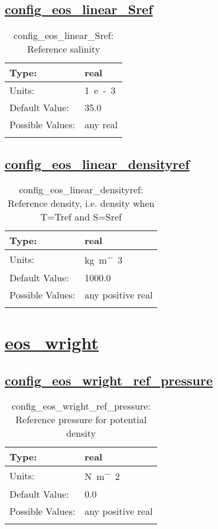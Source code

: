 \subsection[config\_eos\_linear\_Sref]{\hyperref[sec:nm_tab_eos_linear]{config\_eos\_linear\_Sref}}
\label{subsec:nm_sec_config_eos_linear_Sref}
\begin{center}
\begin{longtable}{| p{2.0in} || p{4.0in} |}
    \hline
    Type: & real \\
    \hline
    Units: & \si{1.e-3} \\
    \hline
    Default Value: & 35.0 \\
    \hline
    Possible Values: & any real \\
    \hline
    \caption{config\_eos\_linear\_Sref: Reference salinity}
\end{longtable}
\end{center}
\subsection[config\_eos\_linear\_densityref]{\hyperref[sec:nm_tab_eos_linear]{config\_eos\_linear\_densityref}}
\label{subsec:nm_sec_config_eos_linear_densityref}
\begin{center}
\begin{longtable}{| p{2.0in} || p{4.0in} |}
    \hline
    Type: & real \\
    \hline
    Units: & \si{kg.m^-3} \\
    \hline
    Default Value: & 1000.0 \\
    \hline
    Possible Values: & any positive real \\
    \hline
    \caption{config\_eos\_linear\_densityref: Reference density, i.e. density when T=Tref and S=Sref}
\end{longtable}
\end{center}
\section[eos\_wright]{\hyperref[sec:nm_tab_eos_wright]{eos\_wright}}
\label{sec:nm_sec_eos_wright}
\subsection[config\_eos\_wright\_ref\_pressure]{\hyperref[sec:nm_tab_eos_wright]{config\_eos\_wright\_ref\_pressure}}
\label{subsec:nm_sec_config_eos_wright_ref_pressure}
\begin{center}
\begin{longtable}{| p{2.0in} || p{4.0in} |}
    \hline
    Type: & real \\
    \hline
    Units: & \si{N.m^-2} \\
    \hline
    Default Value: & 0.0 \\
    \hline
    Possible Values: & any positive real \\
    \hline
    \caption{config\_eos\_wright\_ref\_pressure: Reference pressure for potential density}
\end{longtable}
\end{center}
